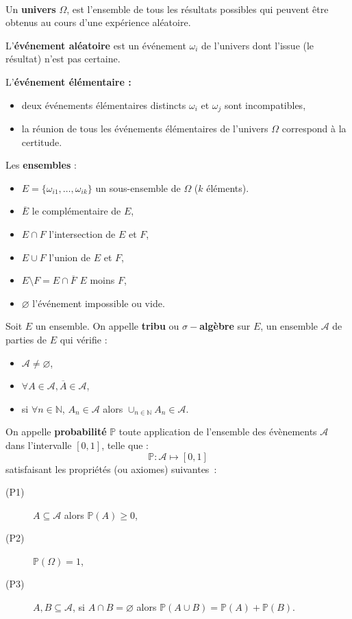 
\begin{f}[Axiomatique]{\ }
	
	Un \textbf{univers} \(\Omega\), est l'ensemble de tous les résultats possibles qui peuvent être obtenus au cours d'une expérience aléatoire.
	
	L'\textbf{événement aléatoire} est un événement \(\omega_i\) de l'univers dont l'issue (le résultat) n'est pas certaine.
	
	
	L'\textbf{événement élémentaire :}
	\begin{itemize}
		\item deux événements élémentaires distincts \(\omega_i\) et \(\omega_j\) sont incompatibles,
		\item la réunion de tous les événements élémentaires de l'univers \(\Omega \) correspond à la certitude.
	\end{itemize}
	
	Les \textbf{ensembles} :
	\begin{itemize}
		\item  \(E=\lbrace \omega_{i1},\ldots , \omega_{ik}\rbrace\) un sous-ensemble de \(\Omega\) (\(k\) éléments).
		\item \(\overline{E}\) le complémentaire de \(E\),
		\item \(E\cap F\) l'intersection de \(E\) et \(F\),
		\item \(E\cup F\) l'union de \(E\) et \(F\),
		\item \(E\setminus F= E\cap\overline{F}\)  \(E\) moins \(F\),
		\item \(\varnothing\) l'événement impossible ou vide.
	\end{itemize}
	
	Soit \(E\) un ensemble. On appelle \textbf{tribu} ou \textbf{\(\sigma-\)algèbre} sur \(E\), un ensemble \(\mathcal{A}\) de parties de \(E\) qui vérifie :
	\begin{itemize}
		\item     \(\mathcal{A} \not=\varnothing\),
		\item     \(\forall A \in \mathcal{A} , \overline{A} \in\mathcal{A}\),
		\item     si \(\forall n \in \mathbb{N}\), \(A_n \in\mathcal{A}\) alors \(\cup_{n\in\mathbb{N} } A_n \in\mathcal{A}\).
	\end{itemize}
	
	On appelle \textbf{probabilité} \(\mathbb{P}\) toute application de l'ensemble des évènements \(\mathcal{A}\) dans l'intervalle \([0,1]\), telle que :      \[\mathbb{P} :      \mathcal{A}  \mapsto   [0,1]\]
	satisfaisant les propriétés (ou axiomes) suivantes~:
	\begin{description}
		\item[(P1)] \(A \subseteq \mathcal{A} \)    alors  \( \mathbb{P}(A) \geq 0\),
		\item[(P2)] \( \mathbb{P}(\Omega) = 1\),
		\item[(P3)] \(A, B \subseteq \mathcal{A}\),  si  \(A\cap B =\varnothing\)    alors   \(\mathbb{P}(A\cup B)=\mathbb{P}(A) + \mathbb{P}(B)\).
	\end{description}
	

\end{f}
